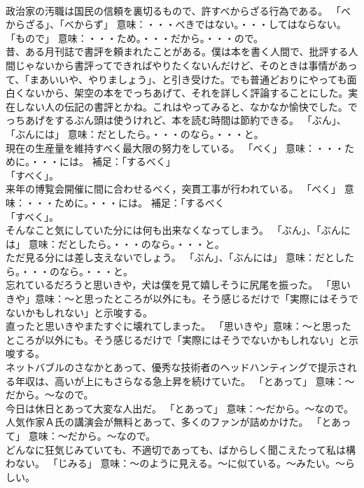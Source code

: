 \documentclass[8pt]{extreport}
\begin{document}
\begin{CJK}{UTF8}{min}
\\	政治家の汚職は国民の信頼を裏切るもので、許すべからざる行為である。	「べからざる」、「べからず」 意味：・・・べきではない。・・・してはならない。 「もので」 意味：・・・ため。・・・だから。・・・ので。	
\\	昔、ある月刊誌で書評を頼まれたことがある。僕は本を書く人間で、批評する人間じゃないから書評ってできればやりたくないんだけど、そのときは事情があって、「まあいいや、やりましょう」、と引き受けた。でも普通どおりにやっても面白くないから、架空の本をでっちあげて、それを詳しく評論することにした。実在しない人の伝記の書評とかね。これはやってみると、なかなか愉快でした。でっちあげをするぶん頭は使うけれど、本を読む時間は節約できる。	「ぶん」、「ぶんには」 意味：だとしたら。・・・のなら。・・・と。	
\\	現在の生産量を維持すべく最大限の努力をしている。	「べく」 意味：・・・ために。・・・には。 補足：「するべく」 
\\	「すべく」。	
\\	来年の博覧会開催に間に合わせるべく，突貫工事が行われている。	「べく」 意味：・・・ために。・・・には。 補足：「するべく 
\\	「すべく」。	
\\	そんなこと気にしていた分には何も出来なくなってしまう。	「ぶん」、「ぶんには」 意味：だとしたら。・・・のなら。・・・と。	
\\	ただ見る分には差し支えないでしょう。	「ぶん」、「ぶんには」 意味：だとしたら。・・・のなら。・・・と。	
\\	忘れているだろうと思いきや，犬は僕を見て嬉しそうに尻尾を振った。	「思いきや」意味：～と思ったところが以外にも。そう感じるだけで「実際にはそうでないかもしれない」と示唆する。	
\\	直ったと思いきやまたすぐに壊れてしまった。	「思いきや」意味：～と思ったところが以外にも。そう感じるだけで「実際にはそうでないかもしれない」と示唆する。	
\\	ネットバブルのさなかとあって、優秀な技術者のヘッドハンティングで提示される年収は、高いが上にもさらなる急上昇を続けていた。	「とあって」 意味：～だから。～なので。	
\\	今日は休日とあって大変な人出だ。	「とあって」 意味：～だから。～なので。	
\\	人気作家Ａ氏の講演会が無料とあって、多くのファンが詰めかけた。	「とあって」 意味：～だから。～なので。	
\\	どんなに狂気じみていても、不適切であっても、ばからしく聞こえたって私は構わない。	「じみる」 意味：～のように見える。～に似ている。～みたい。～らしい。	

\end{CJK}
\end{document}
